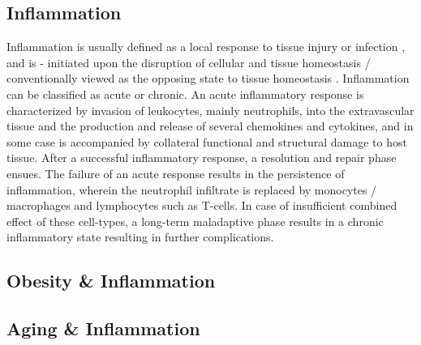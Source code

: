 




    




\subsection{Inflammation}

\par Inflammation is usually defined as a local response to tissue injury or infection \textbf{\cite{donath_islet_2008}}, and is - initiated upon the disruption of cellular and tissue homeostasis / conventionally viewed as the opposing state to tissue homeostasis \textbf{\cite{meizlish_tissue_2021}}. Inflammation can be classified as acute or chronic. An acute inflammatory response is characterized by invasion of leukocytes, mainly neutrophils, into the extravascular tissue and the production and release of several chemokines and cytokines, and in some case is accompanied by collateral functional and structural damage to host tissue. After a successful inflammatory response, a resolution and repair phase ensues. The failure of an acute response results in the persistence of inflammation, wherein the neutrophil infiltrate is replaced by monocytes / macrophages and lymphocytes such as T-cells. In case of insufficient combined effect of these cell-types, a long-term maladaptive phase results in a chronic inflammatory state resulting in further complications. 

\subsection{Obesity \& Inflammation}

\subsection{Aging \& Inflammation}

